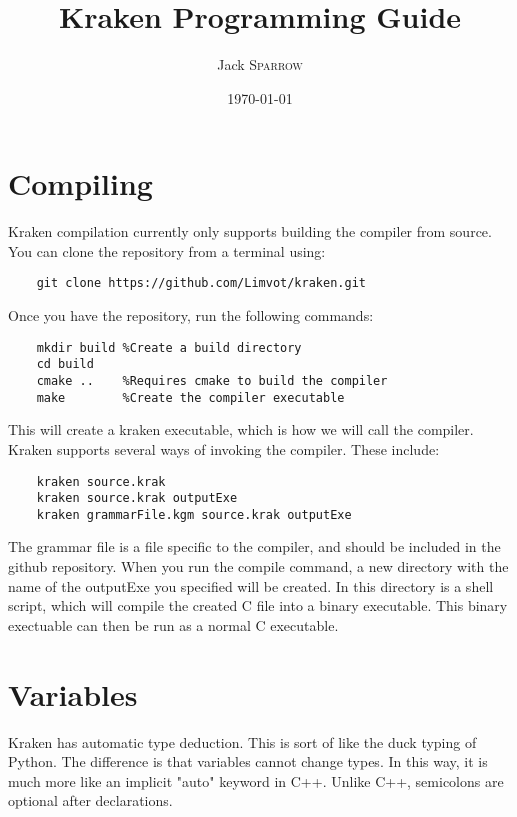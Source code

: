 \documentclass{article}
\title{Kraken Programming Guide} %
\author{Jack \textsc{Sparrow}} %
\date{\today} %
\begin{document}
\maketitle %

\section{Compiling}
  Kraken compilation currently only supports building the compiler from source.
You can clone the repository from a terminal using:
  \begin{lstlisting}
    git clone https://github.com/Limvot/kraken.git
  \end{lstlisting}
Once you have the repository, run the following commands:
  \begin{lstlisting}
    mkdir build %Create a build directory
    cd build
    cmake ..    %Requires cmake to build the compiler
    make        %Create the compiler executable
  \end{lstlisting}
This will create a kraken executable, which is how we will call the compiler.
Kraken supports several ways of invoking the compiler.  These include:
  \begin{lstlisting}
    kraken source.krak
    kraken source.krak outputExe
    kraken grammarFile.kgm source.krak outputExe
  \end{lstlisting}
The grammar file is a file specific to the compiler, and should be included
in the github repository.  When you run the compile command, a new directory
with the name of the outputExe you specified will be created.  In this directory
is a shell script, which will compile the created C file into a binary executable.
This binary exectuable can then be run as a normal C executable.


\section{Variables}
\label{sec:var}
  Kraken has automatic type deduction.  This is sort of like the duck typing of
Python.  The difference is that variables cannot change types.  In this way, it
is much more like an implicit "auto" keyword in C++.  Unlike C++, semicolons are
optional after declarations.
\end{document}

